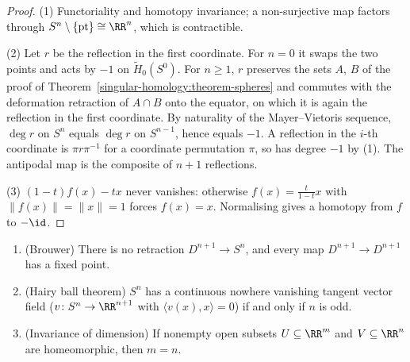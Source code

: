 \begin{proof}
(1) Functoriality and homotopy invariance; a non-surjective map factors through $S^n \setminus \{\mathrm{pt}\} \cong \RR^n$, which is contractible.

(2) Let $r$ be the reflection in the first coordinate. For $n = 0$ it swaps the two points and acts by $-1$ on $\tilde{H}_0(S^0)$. For $n \geq 1$, $r$ preserves the sets $A$, $B$ of
the proof of Theorem~\ref{singular-homology:theorem-spheres} and commutes with the deformation retraction of $A \cap B$ onto the equator, on which it is again the
reflection in the first coordinate. By naturality of the Mayer--Vietoris sequence, $\deg r$ on $S^n$ equals $\deg r$ on $S^{n-1}$, hence equals $-1$. A reflection in the
$i$-th coordinate is $\pi r \pi^{-1}$ for a coordinate permutation $\pi$, so has degree $-1$ by (1). The antipodal map is the composite of $n + 1$ reflections.

(3) $(1 - t)f(x) - tx$ never vanishes: otherwise $f(x) = \frac{t}{1-t}x$ with $\|f(x)\| = \|x\| = 1$ forces $f(x) = x$. Normalising gives a homotopy from $f$ to $-\id$.
\end{proof}

\begin{corollary}\label{singular-homology:corollary-sphere-applications}
\begin{enumerate}
\item (Brouwer) There is no retraction $D^{n+1} \to S^n$, and every map $D^{n+1} \to D^{n+1}$ has a fixed point.
\item (Hairy ball theorem) $S^n$ has a continuous nowhere vanishing tangent vector field ($v \colon S^n \to \RR^{n+1}$ with $\langle v(x), x \rangle = 0$) if and only if
$n$ is odd.
\item (Invariance of dimension) If nonempty open subsets $U \subseteq \RR^m$ and $V \subseteq \RR^n$ are homeomorphic, then $m = n$.
\end{enumerate}
\end{corollary}

